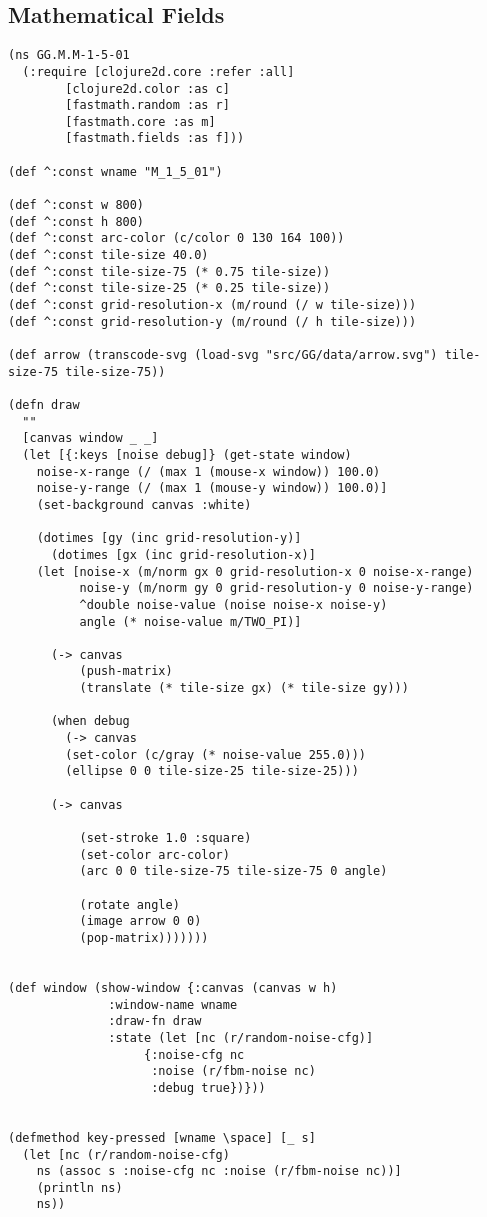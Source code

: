 \documentclass[11pt]{article}
\begin{document}
\subsection{Mathematical Fields}
\label{sec:orge052c7a}
\begin{verbatim}
(ns GG.M.M-1-5-01
  (:require [clojure2d.core :refer :all]
	    [clojure2d.color :as c]
	    [fastmath.random :as r]
	    [fastmath.core :as m]
	    [fastmath.fields :as f]))

(def ^:const wname "M_1_5_01")

(def ^:const w 800)
(def ^:const h 800)
(def ^:const arc-color (c/color 0 130 164 100))
(def ^:const tile-size 40.0)
(def ^:const tile-size-75 (* 0.75 tile-size))
(def ^:const tile-size-25 (* 0.25 tile-size))
(def ^:const grid-resolution-x (m/round (/ w tile-size)))
(def ^:const grid-resolution-y (m/round (/ h tile-size)))

(def arrow (transcode-svg (load-svg "src/GG/data/arrow.svg") tile-size-75 tile-size-75))

(defn draw
  ""
  [canvas window _ _]
  (let [{:keys [noise debug]} (get-state window)
	noise-x-range (/ (max 1 (mouse-x window)) 100.0)
	noise-y-range (/ (max 1 (mouse-y window)) 100.0)]
    (set-background canvas :white)

    (dotimes [gy (inc grid-resolution-y)]
      (dotimes [gx (inc grid-resolution-x)]
	(let [noise-x (m/norm gx 0 grid-resolution-x 0 noise-x-range)
	      noise-y (m/norm gy 0 grid-resolution-y 0 noise-y-range)
	      ^double noise-value (noise noise-x noise-y)
	      angle (* noise-value m/TWO_PI)]

	  (-> canvas
	      (push-matrix)
	      (translate (* tile-size gx) (* tile-size gy)))

	  (when debug
	    (-> canvas
		(set-color (c/gray (* noise-value 255.0)))
		(ellipse 0 0 tile-size-25 tile-size-25)))

	  (-> canvas

	      (set-stroke 1.0 :square)
	      (set-color arc-color)
	      (arc 0 0 tile-size-75 tile-size-75 0 angle)

	      (rotate angle)
	      (image arrow 0 0)
	      (pop-matrix)))))))


(def window (show-window {:canvas (canvas w h)
			  :window-name wname
			  :draw-fn draw
			  :state (let [nc (r/random-noise-cfg)]
				   {:noise-cfg nc
				    :noise (r/fbm-noise nc)
				    :debug true})}))


(defmethod key-pressed [wname \space] [_ s]
  (let [nc (r/random-noise-cfg)
	ns (assoc s :noise-cfg nc :noise (r/fbm-noise nc))]
    (println ns)
    ns))


\end{verbatim}
\end{document}
